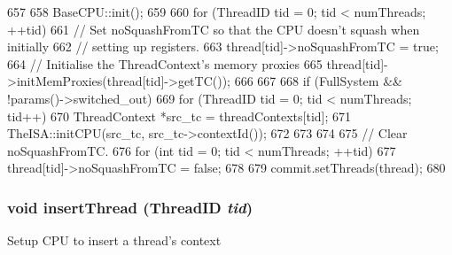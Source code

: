 \begin{DoxyCode}
657 {
658     BaseCPU::init();
659 
660     for (ThreadID tid = 0; tid < numThreads; ++tid) {
661         // Set noSquashFromTC so that the CPU doesn't squash when initially
662         // setting up registers.
663         thread[tid]->noSquashFromTC = true;
664         // Initialise the ThreadContext's memory proxies
665         thread[tid]->initMemProxies(thread[tid]->getTC());
666     }
667 
668     if (FullSystem && !params()->switched_out) {
669         for (ThreadID tid = 0; tid < numThreads; tid++) {
670             ThreadContext *src_tc = threadContexts[tid];
671             TheISA::initCPU(src_tc, src_tc->contextId());
672         }
673     }
674 
675     // Clear noSquashFromTC.
676     for (int tid = 0; tid < numThreads; ++tid)
677         thread[tid]->noSquashFromTC = false;
678 
679     commit.setThreads(thread);
680 }
\end{DoxyCode}
\hypertarget{classFullO3CPU_abf4dca4fa0a9358ec4ac26ccbf17233b}{
\subsubsection[{insertThread}]{\setlength{\rightskip}{0pt plus 5cm}void insertThread ({\bf ThreadID} {\em tid})}}
\label{classFullO3CPU_abf4dca4fa0a9358ec4ac26ccbf17233b}
Setup CPU to insert a thread's context 


